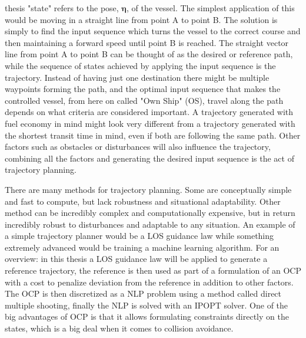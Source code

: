 thesis "state" refers to the pose, $\bm{\eta}$, of the vessel. The simplest application of this would be moving in a straight line from point A to point B.
The solution is simply to find the input sequence which turns the vessel to the correct course and then maintaining a forward speed until point B is reached.
The straight vector line from point A to point B can be thought of as the desired or reference path, while the sequence of states achieved by applying the 
input sequence is the trajectory. Instead of having just one destination there might be multiple waypoints forming the path, and the optimal
input sequence that makes the controlled vessel, from here on called "Own Ship" (OS), travel along the path depends on what criteria are considered important. A trajectory generated with fuel
economy in mind might look very different from a trajectory generated with the shortest transit time in mind, even if both are following the same path.
Other factors such as obstacles or disturbances will also influence the trajectory, combining all the factors and generating the desired
input sequence is the act of trajectory planning.

There are many methods for trajectory planning. Some are conceptually simple and fast to compute, but lack robustness and situational adaptability.
Other method can be incredibly complex and computationally expensive, but in return incredibly robust to disturbances and adaptable to
any situation. An example of a simple trajectory planner would be a \gls{LOS} guidance law while something extremely advanced would be training a machine
learning algorithm. For an overview: in this thesis a \gls{LOS} guidance law will be applied to generate a reference trajectory, the reference is then used as part of a
formulation of an \gls{OCP} with a cost to penalize deviation from the reference in addition to other factors.
The \gls{OCP} is then discretized as a \gls{NLP} problem using a method called direct multiple shooting,
finally the \gls{NLP} is solved with an \gls{IPOPT} solver.
One of the big advantages of \gls{OCP} is that it allows formulating constraints directly on the states, 
which is a big deal when it comes to collision avoidance.

